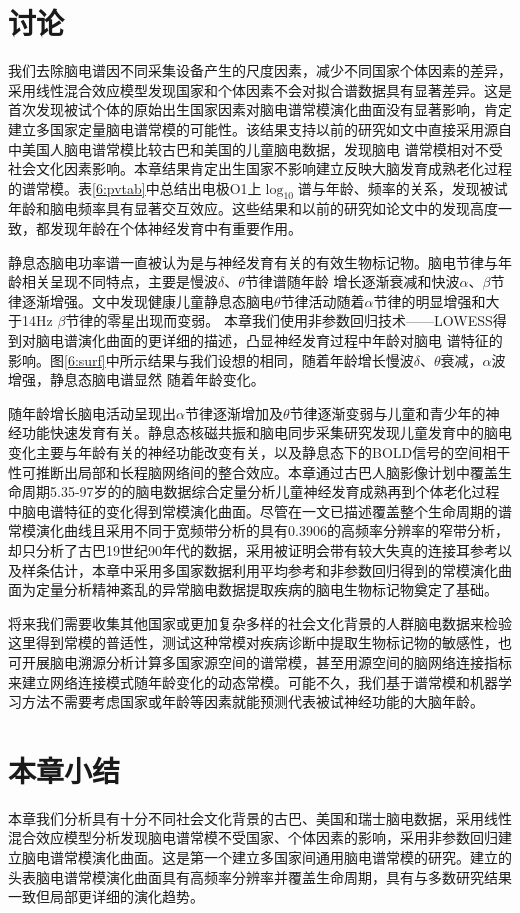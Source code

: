 \section{讨论}
我们去除脑电谱因不同采集设备产生的尺度因素，减少不同国家个体因素的差异，采用线性混合效应模型发现国家和个体因素不会对拟合谱数据具有显著差异。这是首次发现被试个体的原始出生国家因素对脑电谱常模演化曲面没有显著影响，肯定建立多国家定量脑电谱常模的可能性。该结果支持以前的研究如\cite{alvarez1987eeg}文中直接采用源自\cite{john1980developmental}中美国人脑电谱常模比较古巴和美国的儿童脑电数据，发现脑电
谱常模相对不受社会文化因素影响。本章结果肯定出生国家不影响建立反映大脑发育成熟老化过程的谱常模。表\ref{6:pvtab}中总结出电极O1上$\log_{10}$谱与年龄、频率的关系，发现被试年龄和脑电频率具有显著交互效应。这些结果和以前的研究如论文\cite{benninger1984eeg,smit2012brain,vandenbosch2019eeg}中的发现高度一致，都发现年龄在个体神经发育中有重要作用。 

静息态脑电功率谱一直被认为是与神经发育有关的有效生物标记物。脑电节律与年龄相关呈现不同特点，主要是慢波$\delta$、$\theta$节律谱随年龄
增长逐渐衰减和快波$\alpha$、$\beta$节律逐渐增强。\cite{lubar1985eeg}文中发现健康儿童静息态脑电$\theta$节律活动随着$\alpha$节律的明显增强和大于14Hz
$\beta$节律的零星出现而变弱。 本章我们使用非参数回归技术——LOWESS得到对脑电谱演化曲面的更详细的描述，凸显神经发育过程中年龄对脑电
谱特征的影响。图\ref{6:surf}中所示结果与我们设想的相同，随着年龄增长慢波$\delta$、$\theta$衰减，$\alpha$波增强，静息态脑电谱显然
随着年龄变化。

随年龄增长脑电活动呈现出$\alpha$节律逐渐增加及$\theta$节律逐渐变弱与儿童和青少年的神经功能快速发育有关。静息态核磁共振和脑电同步采集研究发现儿童发育中的脑电变化主要与年龄有关的神经功能改变有关，以及静息态下的BOLD信号的空间相干性可推断出局部和长程脑网络间的整合效应。本章通过古巴人脑影像计划中覆盖生命周期5.35-97岁的的脑电数据综合定量分析儿童神经发育成熟再到个体老化过程中脑电谱特征的变化得到常模演化曲面。尽管在\cite{szava1994high}一文已描述覆盖整个生命周期的谱常模演化曲线且采用不同于宽频带分析的具有0.3906的高频率分辨率的窄带分析，却只分析了古巴19世纪90年代的数据，采用被证明会带有较大失真的连接耳参考以及样条估计，本章中采用多国家数据利用平均参考和非参数回归得到的常模演化曲面为定量分析精神紊乱的异常脑电数据提取疾病的脑电生物标记物奠定了基础。

将来我们需要收集其他国家或更加复杂多样的社会文化背景的人群脑电数据来检验这里得到常模的普适性，测试这种常模对疾病诊断中提取生物标记物的敏感性，也可开展脑电溯源分析计算多国家源空间的谱常模，甚至用源空间的脑网络连接指标来建立网络连接模式随年龄变化的动态常模。可能不久，我们基于谱常模和机器学习方法不需要考虑国家或年龄等因素就能预测代表被试神经功能的大脑年龄。
\section{本章小结}
本章我们分析具有十分不同社会文化背景的古巴、美国和瑞士脑电数据，采用线性混合效应模型分析发现脑电谱常模不受国家、个体因素的影响，采用非参数回归建立脑电谱常模演化曲面。这是第一个建立多国家间通用脑电谱常模的研究。建立的头表脑电谱常模演化曲面具有高频率分辨率并覆盖生命周期，具有与多数研究结果一致但局部更详细的演化趋势。
